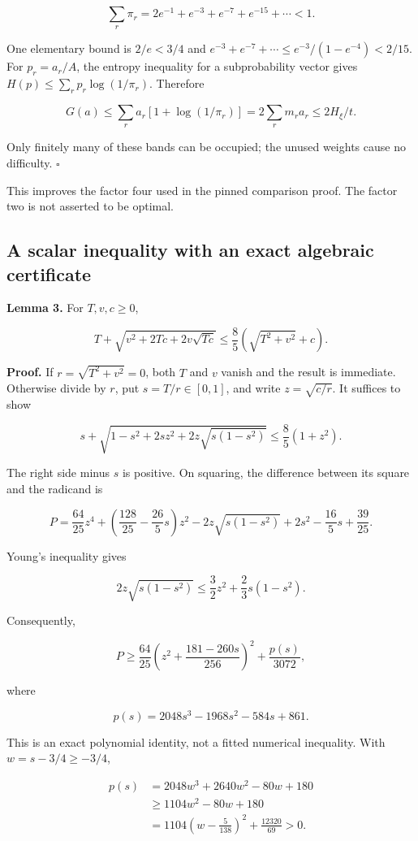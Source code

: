 \documentclass[
  11pt,
  a4paper,
]{article}
\begin{document}
\[
\sum_r\pi_r
=2e^{-1}+e^{-3}+e^{-7}+e^{-15}+\cdots<1.
\]

One elementary bound is \(2/e<3/4\) and
\(e^{-3}+e^{-7}+\cdots\le e^{-3}/(1-e^{-4})<2/15\). For \(p_r=a_r/A\),
the entropy inequality for a subprobability vector gives
\(H(p)\le\sum_rp_r\log(1/\pi_r)\). Therefore

\[
G(a)\le\sum_r a_r[1+\log(1/\pi_r)]
      =2\sum_r m_ra_r\le2H_\xi/t.
\]

Only finitely many of these bands can be occupied; the unused weights
cause no difficulty. \(\square\)

This improves the factor four used in the pinned comparison proof. The
factor two is not asserted to be optimal.

\subsection{A scalar inequality with an exact algebraic
certificate}\label{a-scalar-inequality-with-an-exact-algebraic-certificate}

\textbf{Lemma 3.} For \(T,v,c\ge0\),

\[
T+\sqrt{v^2+2Tc+2v\sqrt{Tc}}
\le\frac85\left(\sqrt{T^2+v^2}+c\right).
\]

\textbf{Proof.} If \(r=\sqrt{T^2+v^2}=0\), both \(T\) and \(v\) vanish
and the result is immediate. Otherwise divide by \(r\), put
\(s=T/r\in[0,1]\), and write \(z=\sqrt{c/r}\). It suffices to show

\[
s+\sqrt{1-s^2+2sz^2+2z\sqrt{s(1-s^2)}}
\le\frac85(1+z^2).
\]

The right side minus \(s\) is positive. On squaring, the difference
between its square and the radicand is

\[
P=\frac{64}{25}z^4+
 \left(\frac{128}{25}-\frac{26}{5}s\right)z^2
 -2z\sqrt{s(1-s^2)}+2s^2-\frac{16}{5}s+\frac{39}{25}.
\]

Young's inequality gives

\[
2z\sqrt{s(1-s^2)}\le\frac32z^2+\frac23s(1-s^2).
\]

Consequently,

\[
P\ge\frac{64}{25}
 \left(z^2+\frac{181-260s}{256}\right)^2+\frac{p(s)}{3072},
\]

where

\[
p(s)=2048s^3-1968s^2-584s+861.
\]

This is an exact polynomial identity, not a fitted numerical inequality.
With \(w=s-3/4\ge-3/4\),

\[
\begin{aligned}
p(s)&=2048w^3+2640w^2-80w+180\\
&\ge1104w^2-80w+180\\
&=1104\left(w-\frac{5}{138}\right)^2+\frac{12320}{69}>0.
\end{aligned}
\]
\end{document}
